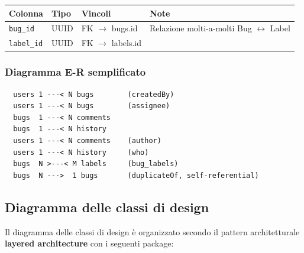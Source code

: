 \begin{center}
\small
\begin{tabular}{|l|l|l|p{5cm}|}
\hline
\textbf{Colonna} & \textbf{Tipo} & \textbf{Vincoli} & \textbf{Note} \\
\hline
\texttt{bug\_id} & UUID & FK $\rightarrow$ bugs.id & Relazione molti-a-molti Bug $\leftrightarrow$ Label \\
\hline
\texttt{label\_id} & UUID & FK $\rightarrow$ labels.id & \\
\hline
\end{tabular}
\end{center}

\subsubsection{Diagramma E-R semplificato}

\begin{verbatim}
  users 1 ---< N bugs        (createdBy)
  users 1 ---< N bugs        (assignee)
  bugs  1 ---< N comments
  bugs  1 ---< N history
  users 1 ---< N comments    (author)
  users 1 ---< N history     (who)
  bugs  N >---< M labels     (bug_labels)
  bugs  N --->  1 bugs       (duplicateOf, self-referential)
\end{verbatim}


\subsection{Diagramma delle classi di design}

Il diagramma delle classi di design è organizzato secondo il pattern architetturale
\textbf{layered architecture} con i seguenti package:


